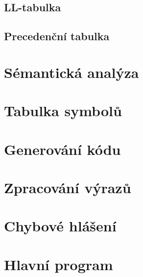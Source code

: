 \documentclass[11pt,a4paper]{article}
\begin{document}
    \subsection{LL-tabulka}

    \subsection{Precedenční tabulka}


    \section{Sémantická analýza}


    \section{Tabulka symbolů}


    \section{Generování kódu}


    \section{Zpracování výrazů}


    \section{Chybové hlášení}


    \section{Hlavní program}
\end{document}
